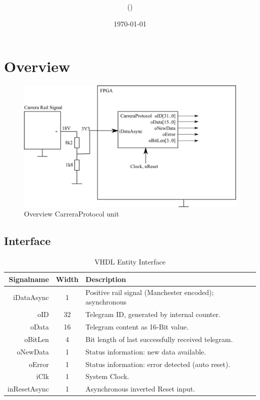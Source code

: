 \documentclass {scrartcl}
\title {\Subject \\ \VersionNr}
\author {\Name (\Number)}
\date {\today}
\begin{document}
\maketitle
\tableofcontents
\newpage
\section{Overview}
\begin{figure}[h]
	\centering
		\includegraphics{./Blockdiagramm.PNG}
	\caption{Overview CarreraProtocol unit}
	\label{fig:SocGhostCar_IP}
\end{figure}

\subsection{Interface}

\begin{table}[h]
	\centering
		\begin{tabular}{|r|c|l|}
		\hline
		\textbf{Signalname} & \textbf{Width} & \textbf{Description} \\
		\hline		
		\hline
		iDataAsync & 1 & Positive rail signal (Manchester encoded); asynchronous \\
		\hline
		oID & 32 & Telegram ID, generated by internal counter.\\
		oData & 16 & Telegram content as 16-Bit value.\\
		oBitLen & 4 & Bit length of last successfully received telegram.\\
		\hline
		oNewData & 1 & Status information: new data available.\\
		oError & 1 & Status information: error detected (auto reset).\\
		\hline
		iClk & 1 & System Clock.\\
		inResetAsync & 1 & Asynchronous inverted Reset input.\\
		\hline
		\end{tabular}
	\caption{VHDL Entity Interface}
	\label{tab:VHDLEntityInterface}
\end{table}
\end{document}
